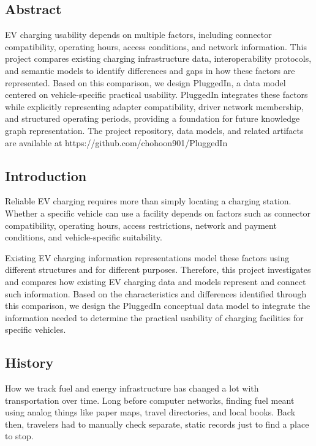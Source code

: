 \documentclass[sigconf]{acmart}
\begin{document}
\subsection{Abstract}

EV charging usability depends on multiple factors, including connector compatibility, operating hours, access conditions, and network information. This project compares existing charging infrastructure data, interoperability protocols, and semantic models to identify differences and gaps in how these factors are represented. Based on this comparison, we design PluggedIn, a data model centered on vehicle-specific practical usability. PluggedIn integrates these factors while explicitly representing adapter compatibility, driver network membership, and structured operating periods, providing a foundation for future knowledge graph representation. The project repository, data models, and related artifacts are available at https://github.com/chohoon901/PluggedIn


\subsection{Introduction}

Reliable EV charging requires more than simply locating a charging station. Whether a specific vehicle can use a facility depends on factors such as connector compatibility, operating hours, access restrictions, network and payment conditions, and vehicle-specific suitability.

Existing EV charging information representations model these factors using different structures and for different purposes. Therefore, this project investigates and compares how existing EV charging data and models represent and connect such information. Based on the characteristics and differences identified through this comparison, we design the PluggedIn conceptual data model to integrate the information needed to determine the practical usability of charging facilities for specific vehicles.


\subsection{History}

How we track fuel and energy infrastructure has changed a lot with transportation over time. Long before computer networks, finding fuel meant using analog things like paper maps, travel directories, and local books. Back then, travelers had to manually check separate, static records just to find a place to stop.
\end{document}
